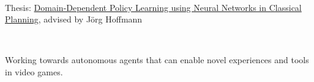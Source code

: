 \documentclass[]{lukas-cv-openfont}
\begin{document}
\noindent
{}
\\
\begin{tightitemize}{1.7em}
    \item Thesis: \href{https://www.lukaschaefer.com/assets/files/bsc_thesis.pdf}{Domain-Dependent Policy Learning using Neural Networks in Classical Planning}, advised by J\"org Hoffmann
\end{tightitemize}

\largesectionsep



\noindent
{}
\\
\begin{tightitemize}{1.7em}
    \item Working towards autonomous agents that can enable novel experiences and tools in video games.
\end{tightitemize}
\sectionsep
\end{document}
